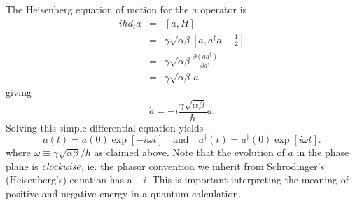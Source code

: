 The Heisenberg equation of motion for the $a$ operator is \begin{eqnarray*}
i\hbar d_{t}a & = & [a,H] \\
& = & \gamma\sqrt{\alpha\beta}[a,a^{\dagger}a+\frac{1}{2}] \\
& = & \gamma\sqrt{\alpha\beta}\frac{\partial(aa^{\dagger})}{\partial a^{\dagger}} \\
& = & \gamma\sqrt{\alpha\beta}\,a \end{eqnarray*}
giving \begin{equation}
\dot{a} = -i\frac{\gamma\sqrt{\alpha\beta}}{\hbar}a .\end{equation}
Solving this simple differential equation yields \begin{equation}
a(t) = a(0)\exp\left[-i \omega t \right] \quad \textrm{and} \quad a^{\dagger}(t) = a^{\dagger}(0)\exp\left[i \omega t \right] . \end{equation}
where $\omega \equiv \gamma\sqrt{\alpha\beta}/\hbar$ as claimed above.
Note that the evolution of $a$ in the phase plane is $\emph{clockwise}$, ie. the phasor convention we inherit from Schrodinger's (Heisenberg's) equation has a $-i$.
This is important interpreting the meaning of positive and negative energy in a quantum calculation.
